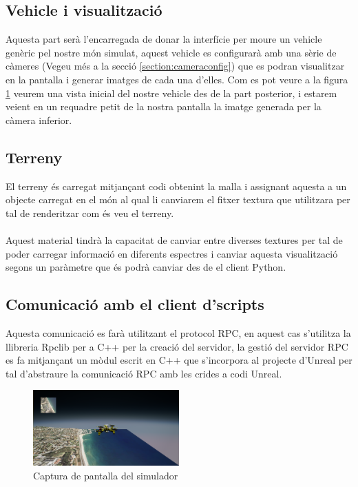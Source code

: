 \documentclass[10pt,a4paper,twocolumn,twoside]{article}
\begin{document}
\subsection{Vehicle i visualització}
Aquesta part serà l'encarregada de donar la interfície per moure un vehicle genèric pel nostre món simulat, aquest vehicle es configurarà amb una sèrie de càmeres (Vegeu més a la secció \ref{section:cameraconfig}) que es podran visualitzar en la pantalla i generar imatges de cada una d'elles. Com es pot veure a la figura \ref{fig-screenshotsimulator} veurem una vista inicial del nostre vehicle des de la part posterior, i estarem veient en un requadre petit de la nostra pantalla la imatge generada per la càmera inferior.

\subsection{Terreny}
El terreny és carregat mitjançant codi obtenint la malla i assignant aquesta a un objecte carregat en el món al qual li canviarem el fitxer textura que utilitzara per tal de renderitzar com és veu el terreny. 
\\
\\
Aquest material tindrà la capacitat de canviar entre diverses textures per tal de poder carregar informació en diferents espectres i canviar aquesta visualització segons un paràmetre que és podrà canviar des de el client Python.

\subsection{Comunicació amb el client d'scripts}

Aquesta comunicació es farà utilitzant el protocol RPC, en aquest cas s'utilitza la llibreria Rpclib\cite{rpclib} per a C++ per la creació del servidor, la gestió del servidor RPC es fa mitjançant un mòdul escrit en C++ que s'incorpora al projecte d'Unreal per tal d'abstraure la comunicació RPC amb les crides a codi Unreal.

\begin{figure}[!h]
\centering
  	\includegraphics[width=0.5\textwidth]{simulator_example}
	\caption{Captura de pantalla del simulador}
	\label{fig-screenshotsimulator}
\end{figure}
\end{document}
